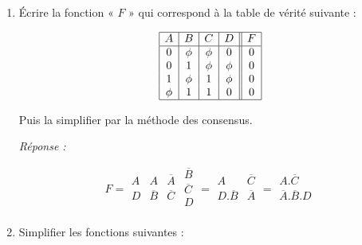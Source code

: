 \begin{enumerate} [label=\arabic*$^\circ$]
\medskip 

\item Écrire la fonction «  $F$ » qui correspond à la table de vérité suivante : 
\medskip

\[
\begin{array}{|c|c|c|c||c|}       
   \hline 
	 A & B & C & D & F \\
   \hline 
      0 & \phi & \phi & 0 & 0 \\
      0 & 1 & \phi & \phi & 0 \\
      1 & \phi & 1 & \phi & 0 \\
      \phi & 1 & 1 & 0 & 0 \\
    \hline   	 
\end{array}
\]

\medskip 

Puis la simplifier par la méthode des consensus. 


 \textsl{Réponse :}
 
 \medskip
 
 \[ F = 
 \begin{array}{|c|c|c} 
     A & A & \overline{A} \\
     D & \overline{B} & \overline{C} \\
 \end{array} \begin{array}{|c|}  \overline{B} \\ \overline{C} \\ D \\ \end{array} 
      = \begin{array}{|c|c|}  A & \overline{C} \\ D . \overline{B} & \overline{A} \\ \end{array} 
      = \begin{array}{|l|} A . \overline{C} \\ \overline{A} . \overline{B} . D \\\end{array} 
 \]
 
 \medskip 
 
\item Simplifier les fonctions suivantes : 

\medskip


\end{enumerate}
